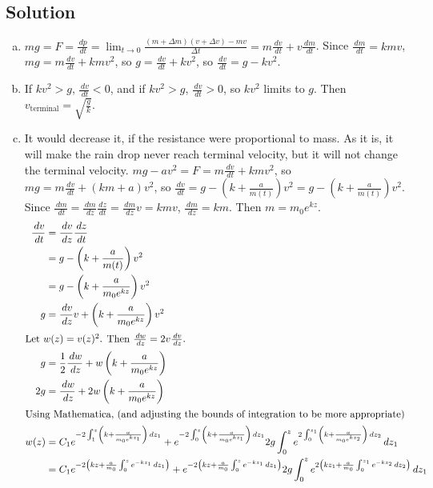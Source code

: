 \documentclass[solutions]{esg8012pset}
\renewcommand{\d}{\,d}
\begin{document}
\subsection{Solution}
  \begin{enumerate}[a)]
    \item $m g = F = \frac{\d p}{\d t} = \lim_{t\rightarrow 0} \frac{(m + \Delta m)(v + \Delta v) - m v}{\Delta t} = m\frac{\d v}{\d t} + v \frac{\d m}{\d t}$.  Since $\frac{\d m}{\d t} = k m v$, $m g = m\frac{\d v}{\d t} + k m v^2$, so $g = \frac{\d v}{\d t} + k v^2$, so $\frac{\d v}{\d t} = g - k v^2$.
    \item If $k v^2 > g$, $\frac{\d v}{\d t} < 0$, and if $k v^2 > g$, $\frac{\d v}{\d t} > 0$, so $k v^2$ limits to $g$.  Then $v_{\text{terminal}} = \sqrt{\frac{g}{k}}$.
    \item It would decrease it, if the resistance were proportional to mass.  As it is, it will make the rain drop never reach terminal velocity, but it will not change the terminal velocity.  $m g - a v^2 = F = m\frac{\d v}{\d t} + k m v^2$, so $m g = m\frac{\d v}{\d t} + (k m + a) v^2$, so $\frac{\d v}{\d t} = g - \left(k + \frac{a}{m(t)}\right) v^2 = g - \left(k + \frac{a}{m(t)}\right) v^2$.  Since $\frac{\d m}{\d t} = \frac{\d m}{\d z}\frac{\d z}{\d t} = \frac{\d m}{\d z}v = k m v$, $\frac{\d m}{\d z} = k m$.  Then $m = m_0 e^{k z}$.  \begin{align*}
   \frac{\d v}{\d t} & = \frac{\d v}{\d z} \frac{\d z}{\d t} \\
    & = g - \left(k + \frac{a}{m(t)}\right) v^2 \\
    & = g - \left(k + \frac{a}{m_0 e^{k z}}\right) v^2 \\
   g & = \frac{\d v}{\d z}v + \left(k + \frac{a}{m_0 e^{k z}}\right) v^2 \\
   \intertext{Let $w(z) = v(z)^2$.  Then $\frac{\d w}{\d z} = 2v\frac{\d v}{\d z}$.}
   g & = \frac{1}{2}\frac{\d w}{\d z} + w\left(k + \frac{a}{m_0 e^{k z}}\right) \\
   2g & = \frac{\d w}{\d z} + 2w\left(k + \frac{a}{m_0 e^{k z}}\right) \\
   \intertext{Using Mathematica, (and adjusting the bounds of integration to be more appropriate)}
   w(z) & = C_1 e^{-2\int_1^z \left(k + \frac{a}{m_0 e^{k z_1}}\right)\d z_1} + e^{-2\int_0^z \left(k + \frac{a}{m_0 e^{k z_1}}\right)\d z_1} 2g\int_0^z e^{2\int_0^{z_1}\left(k + \frac{a}{m_0 e^{k z_2}}\right)\d z_2} \d z_1 \\
    & = C_1 e^{-2\left( k z + \frac{a}{m_0} \int_0^z e^{-k z_1}\d z_1\right)} + e^{-2\left( k z + \frac{a}{m_0}\int_0^z e^{-k z_1}\d z_1\right)} 2g\int_0^z e^{2\left(k z_1 + \frac{a}{m_0}\int_0^{z_1}e^{-k z_2}\d z_2\right)} \d z_1 \\

\end{align*}
\end{enumerate}
\end{document}
